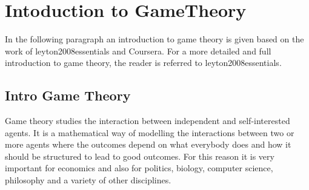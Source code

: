 \chapter{Intoduction to GameTheory}
\label{cha:1}
%



In the following paragraph an introduction to game theory is given based on the work of 
{leyton2008essentials} 
and 
{Coursera}. 
For a more detailed and full introduction to game theory, the reader is referred to 
{leyton2008essentials}. 
\section{Intro Game Theory}
\label{Cha:1:Intro.Game.Theory}




Game theory studies the interaction between independent and self-interested agents. It is a mathematical way of modelling the interactions between two or more agents where the outcomes depend on what everybody does and how it should be structured to lead to good outcomes. For this reason it is very important for economics and also for politics, biology, computer science, philosophy and a variety of other disciplines.  \\


